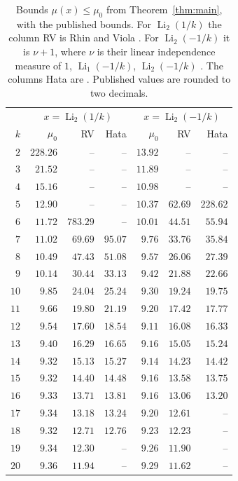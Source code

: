 \documentclass[11pt]{amsart}
\theoremstyle{definition}
\theoremstyle{remark}
\numberwithin{equation}{section}
\newcommand{\Li}{\operatorname{Li}}
\begin{document}
\begin{table}[ht]
\centering
\renewcommand{\arraystretch}{1.1}
\setlength{\tabcolsep}{4pt}
\begin{tabular}{@{}r|rrr|rrr@{}}
\toprule
 & \multicolumn{3}{c|}{$x=\Li_2(1/k)$} & \multicolumn{3}{c}{$x=\Li_2(-1/k)$}\\
$k$ & $\mu_0$ & RV & Hata & $\mu_0$ & RV & Hata\\
\midrule
$2$ & $228.26$ & -- & -- & $13.92$ & -- & --\\
$3$ & $21.52$ & -- & -- & $11.89$ & -- & --\\
$4$ & $15.16$ & -- & -- & $10.98$ & -- & --\\
$5$ & $12.90$ & -- & -- & $10.37$ & $62.69$ & $228.62$\\
$6$ & $11.72$ & $783.29$ & -- & $10.01$ & $44.51$ & $55.94$\\
$7$ & $11.02$ & $69.69$ & $95.07$ & $9.76$ & $33.76$ & $35.84$\\
$8$ & $10.49$ & $47.43$ & $51.08$ & $9.57$ & $26.06$ & $27.39$\\
$9$ & $10.14$ & $30.44$ & $33.13$ & $9.42$ & $21.88$ & $22.66$\\
$10$ & $9.85$ & $24.04$ & $25.24$ & $9.30$ & $19.24$ & $19.75$\\
$11$ & $9.66$ & $19.80$ & $21.19$ & $9.20$ & $17.42$ & $17.77$\\
$12$ & $9.54$ & $17.60$ & $18.54$ & $9.11$ & $16.08$ & $16.33$\\
$13$ & $9.40$ & $16.29$ & $16.65$ & $9.16$ & $15.05$ & $15.24$\\
$14$ & $9.32$ & $15.13$ & $15.27$ & $9.14$ & $14.23$ & $14.42$\\
$15$ & $9.32$ & $14.40$ & $14.48$ & $9.16$ & $13.58$ & $13.75$\\
$16$ & $9.33$ & $13.71$ & $13.81$ & $9.16$ & $13.06$ & $13.20$\\
$17$ & $9.34$ & $13.18$ & $13.24$ & $9.20$ & $12.61$ & --\\
$18$ & $9.32$ & $12.71$ & $12.76$ & $9.23$ & $12.23$ & --\\
$19$ & $9.34$ & $12.30$ & -- & $9.26$ & $11.90$ & --\\
$20$ & $9.36$ & $11.94$ & -- & $9.29$ & $11.62$ & --\\
\bottomrule
\end{tabular}
\caption{Bounds $\mu(x)\le\mu_0$ from Theorem~\ref{thm:main}, with the published bounds. For $\Li_2(1/k)$ the
column RV is Rhin and Viola \cite[pp.~434--435]{RhinViola05}. For $\Li_2(-1/k)$ it is $\nu+1$, where $\nu$ is their
linear independence measure of $1$, $\Li_1(-1/k)$, $\Li_2(-1/k)$ \cite[Table~1]{RhinViola19}. The columns Hata are
\cite[Tables~1 and~2, p.~386]{Hata93dilog}. Published values are rounded to two decimals.}\label{tab:values}
\end{table}
\end{document}
